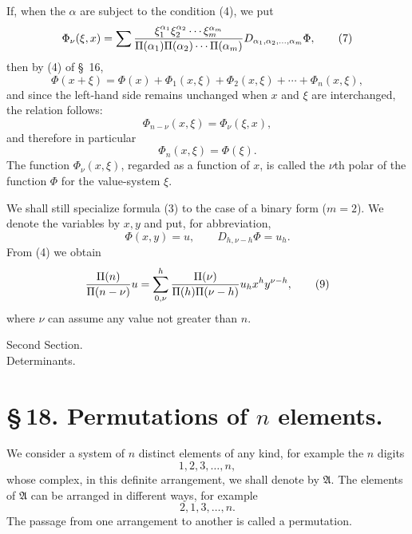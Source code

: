 \documentclass[11pt]{article}
\begin{document}
If, when the $\alpha$ are subject to the condition (4), we put
\begin{equation}
 \Phi_\nu(\xi,x)=
 \sum {\xi_1^{\alpha_1}\xi_2^{\alpha_2}\cdots\xi_m^{\alpha_m}
 \over \Pi(\alpha_1)\Pi(\alpha_2)\cdots\Pi(\alpha_m)}
 D_{\alpha_1,\alpha_2,\ldots,\alpha_m}\Phi,
\tag{7}
\end{equation}
then by (4) of \S~16,
\begin{equation}
 \Phi(x+\xi)=\Phi(x)+\Phi_1(x,\xi)+\Phi_2(x,\xi)+\cdots+\Phi_n(x,\xi),
\tag{8}
\end{equation}
and since the left-hand side remains unchanged when $x$ and $\xi$ are interchanged, the relation follows:
\begin{equation}
 \Phi_{n-\nu}(x,\xi)=\Phi_\nu(\xi,x),
\tag{9}
\end{equation}
and therefore in particular
\begin{equation}
 \Phi_n(x,\xi)=\Phi(\xi).
\tag{10}
\end{equation}
The function $\Phi_\nu(x,\xi)$, regarded as a function of $x$, is called the $\nu$th polar of the function $\Phi$ for the value-system $\xi$.

We shall still specialize formula (3) to the case of a binary form ($m=2$). We denote the variables by $x,y$ and put, for abbreviation,
\[
 \Phi(x,y)=u,\qquad D_{h,\nu-h}\Phi=u_h.
\]
From (4) we obtain
\begin{equation}
 {\Pi(n)\over\Pi(n-\nu)}u
 =
 \sum_{0,\nu}^{h}{\Pi(\nu)\over\Pi(h)\Pi(\nu-h)}
 u_h x^h y^{\nu-h},
\tag{9}
\end{equation}
where $\nu$ can assume any value not greater than $n$.


\clearpage
\begin{center}
{\large Second Section.}\\[0.5em]
{\Large Determinants.}\\[0.4em]
\end{center}

\section*{\S\,18. Permutations of \(n\) elements.}

We consider a system of \(n\) distinct elements of any kind, for example the \(n\) digits
\[
 1,2,3,\ldots,n,
\]
whose complex, in this definite arrangement, we shall denote by \(\mathfrak A\). The elements of \(\mathfrak A\) can be arranged in different ways, for example
\[
 2,1,3,\ldots,n.
\]
The passage from one arrangement to another is called a permutation.
\end{document}
